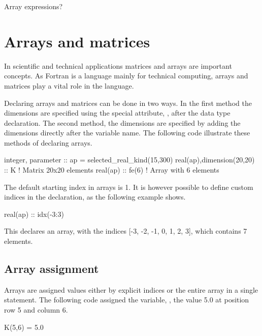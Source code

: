 Array expressions?


\section{Arrays and matrices}

In scientific and technical applications matrices and arrays are important concepts. As Fortran is a language mainly for
technical computing, arrays and matrices play a vital role in the language.

Declaring arrays and matrices can be done in two ways. In the first method the dimensions are specified using the special attribute, , after the data type declaration. The second method, the dimensions are specified by adding the dimensions directly after the variable name. The following code illustrate these methods of declaring arrays.

\begin{fortrancodeenv}
integer, parameter :: ap = selected_real_kind(15,300)
real(ap),dimension(20,20) :: K ! Matrix 20x20 elements
real(ap) :: fe(6) ! Array with 6 elements
\end{fortrancodeenv}

The default starting index in arrays is 1. It is however possible to define custom indices in the declaration, as the following example shows.

\begin{fortrancodeenv}
real(ap) :: idx(-3:3)
\end{fortrancodeenv}

This declares an array,  with the indices [-3, -2,
-1, 0, 1, 2, 3], which contains 7 elements.

\subsection{Array assignment}

Arrays are assigned values either by explicit indices or the entire array in a single statement. The following code assigned the variable, , the value 5.0 at position row 5 and column 6.

\begin{fortrancodeenv}
K(5,6) = 5.0
\end{fortrancodeenv}

